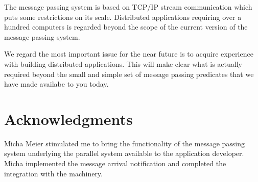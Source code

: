 The \eclipse message passing system is based on TCP/IP stream communication
which puts some restrictions on its scale. Distributed applications
requiring  over a hundred computers is regarded beyond the scope of 
the current version of the \eclipse message passing system.

We regard the most important issue for the near future is to acquire
experience with building distributed \eclipse applications. This will
make clear what is actually required beyond the small and simple set of 
message passing predicates that we have made availabe to you today.



\section*{Acknowledgments}
Micha Meier stimulated me to bring the functionality of the
message passing system underlying the parallel \eclipse system
available to the \eclipse application developer. Micha implemented
the message arrival notification and completed the integration 
with the \eclipse machinery.





